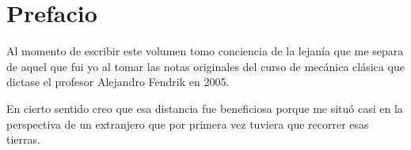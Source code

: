 \thispagestyle{empty}
\chapter*{Prefacio}

Al momento de escribir este volumen tomo conciencia de la lejanía que me separa de aquel que fui yo al tomar 
las notas originales del curso de mecánica clásica que dictase el profesor Alejandro Fendrik en 2005.

En cierto sentido creo que esa distancia fue beneficiosa porque me situó casi en la perspectiva de un
extranjero que por primera vez tuviera que recorrer esas tierras.

